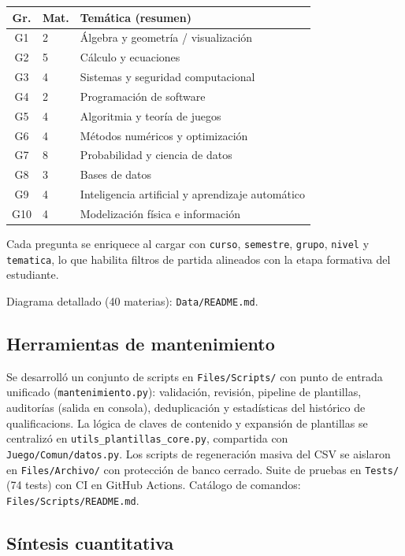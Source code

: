 \documentclass[11pt,a4paper]{article}
\newcommand{\iniciotabla}{\par\medskip\renewcommand{\arraystretch}{1.12}}
\newcommand{\fintabla}{\par\medskip}
\begin{document}
{\small\iniciotabla
\begin{tabular}{@{}clp{5.8cm}@{}}
\toprule
\textbf{Gr.} & \textbf{Mat.} & \textbf{Temática (resumen)} \\
\midrule
G1 & 2 & Álgebra y geometría / visualización \\
G2 & 5 & Cálculo y ecuaciones \\
G3 & 4 & Sistemas y seguridad computacional \\
G4 & 2 & Programación de software \\
G5 & 4 & Algoritmia y teoría de juegos \\
G6 & 4 & Métodos numéricos y optimización \\
G7 & 8 & Probabilidad y ciencia de datos \\
G8 & 3 & Bases de datos \\
G9 & 4 & Inteligencia artificial y aprendizaje automático \\
G10 & 4 & Modelización física e información \\
\bottomrule
\end{tabular}
\label{tab:grupos}
\fintabla}

Cada pregunta se enriquece al cargar con \texttt{curso}, \texttt{semestre}, \texttt{grupo}, \texttt{nivel} y \texttt{tematica}, lo que habilita filtros de partida alineados con la etapa formativa del estudiante.

Diagrama detallado (40 materias): \texttt{Data/README.md}.

\subsection{Herramientas de mantenimiento}

Se desarrolló un conjunto de scripts en \texttt{Files/Scripts/} con punto de entrada unificado (\texttt{mantenimiento.py}): validación, revisión, pipeline de plantillas, auditorías (salida en consola), deduplicación y estadísticas del histórico de qualificacions. La lógica de claves de contenido y expansión de plantillas se centralizó en \texttt{utils\_plantillas\_core.py}, compartida con \texttt{Juego/Comun/datos.py}. Los scripts de regeneración masiva del CSV se aislaron en \texttt{Files/Archivo/} con protección de banco cerrado. Suite de pruebas en \texttt{Tests/} (74 tests) con CI en GitHub Actions. Catálogo de comandos: \texttt{Files/Scripts/README.md}.

\subsection{Síntesis cuantitativa}
\end{document}

